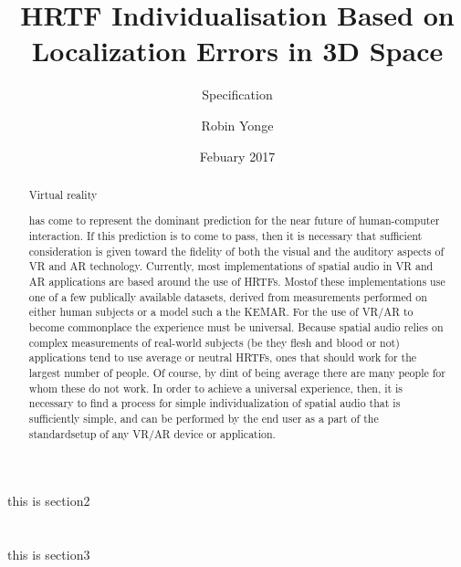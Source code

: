 \documentclass[10pt, oneside, a4paper, draft]{scrartcl}
\begin{document}

\title{HRTF Individualisation Based on Localization Errors in 3D Space}
\subtitle{Specification}
\author{Robin Yonge}
\date{Febuary 2017}
\maketitle

\renewcommand{\abtractname}{Introduction} %
\begin {abstract}
Virtual reality has come to represent the dominant prediction for the near future of human-computer interaction. If this prediction is to come to pass, then it is necessary that sufficient consideration is given toward the fidelity of both the visual and the auditory aspects of VR and AR technology. Currently, most implementations of spatial audio in VR and AR applications are based around the use of HRTFs. Mostof these implementations use one of a few publically available datasets, derived from measurements performed on either human subjects or a model such a the KEMAR\cite{Algazi2001}\cite{Gardner1994}. For the use of VR/AR to become commonplace the experience must be universal. Because spatial audio relies on complex measurements of real-world subjects (be they flesh and blood or not) applications tend to use average or neutral HRTFs, ones that should work for the largest number of people. Of course, by dint of being average there are many people for whom these do not work. In order to achieve a universal experience, then, it is necessary to find a process for  simple individualization of spatial audio that is sufficiently simple, and can be performed by the end user as a part of the standardsetup of any VR/AR device or application.
\end {abstract}

\section*{}


\section*{}
this is section2

\section*{}
this is section3
\end{document}
